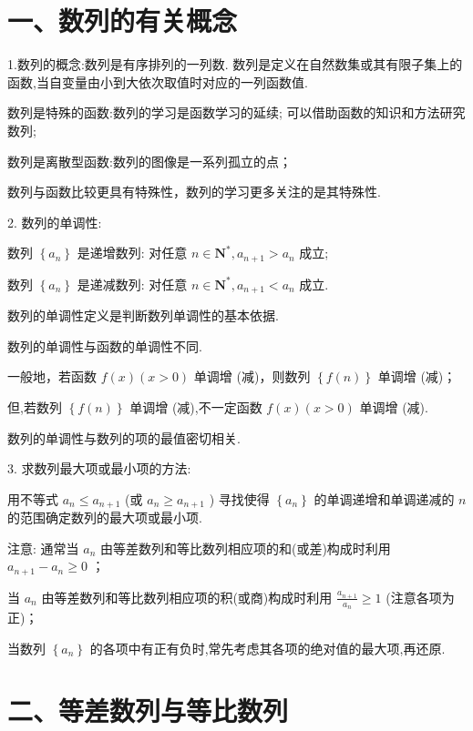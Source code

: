 \section*{一、数列的有关概念}

1.数列的概念:数列是有序排列的一列数. 数列是定义在自然数集或其有限子集上的函数,当自变量由小到大依次取值时对应的一列函数值.

  数列是特殊的函数:数列的学习是函数学习的延续; 可以借助函数的知识和方法研究数列;

  数列是离散型函数:数列的图像是一系列孤立的点；

  数列与函数比较更具有特殊性，数列的学习更多关注的是其特殊性.

2. 数列的单调性:

数列 $\left\{  {a}_{n}\right\}$ 是递增数列: 对任意 $n \in  {\mathbf{N}}^{ * },{a}_{n + 1} > {a}_{n}$ 成立;

数列 $\left\{  {a}_{n}\right\}$ 是递减数列: 对任意 $n \in  {\mathbf{N}}^{ * },{a}_{n + 1} < {a}_{n}$ 成立.

  数列的单调性定义是判断数列单调性的基本依据.

  数列的单调性与函数的单调性不同.

一般地，若函数 $f\left( x\right) \left( {x > 0}\right)$ 单调增 (减)，则数列 $\left\{  {f\left( n\right) }\right\}$ 单调增 (减)；

但,若数列 $\left\{  {f\left( n\right) }\right\}$ 单调增 (减),不一定函数 $f\left( x\right) \left( {x > 0}\right)$ 单调增 (减).

  数列的单调性与数列的项的最值密切相关.

3. 求数列最大项或最小项的方法:

用不等式 ${a}_{n} \leq  {a}_{n + 1}$ (或 ${a}_{n} \geq  {a}_{n + 1}$ ) 寻找使得 $\left\{  {a}_{n}\right\}$ 的单调递增和单调递减的 $n$ 的范围确定数列的最大项或最小项.

注意:   通常当 ${a}_{n}$ 由等差数列和等比数列相应项的和(或差)构成时利用 ${a}_{n + 1} - {a}_{n} \geq  0$ ；

   当 ${a}_{n}$ 由等差数列和等比数列相应项的积(或商)构成时利用 $\frac{{a}_{n + 1}}{{a}_{n}} \geq  1$ (注意各项为正)；

   当数列 $\left\{  {a}_{n}\right\}$ 的各项中有正有负时,常先考虑其各项的绝对值的最大项,再还原.

\section*{二、等差数列与等比数列}


